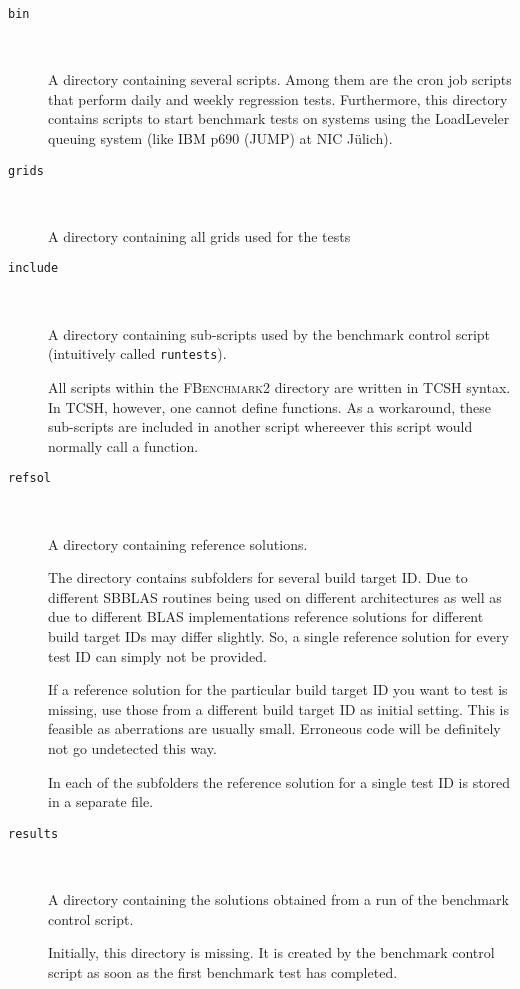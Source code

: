 \begin{description}
\item[\texttt{bin}] \

  A directory containing several scripts. Among them are the cron job scripts
  that perform daily and weekly regression tests. Furthermore, this directory
  contains scripts to start benchmark tests on systems using the LoadLeveler
  queuing system (like IBM p690 (JUMP) at NIC J\"ulich).

\item[\texttt{grids}] \

  A directory containing all grids used for the tests

\item[\texttt{include}] \

  A directory containing sub-scripts used by the benchmark control script
  (intuitively called \texttt{runtests}).

  All scripts within the \textsc{FBenchmark2} directory are written in TCSH
  syntax. In TCSH, however, one cannot define functions. As a workaround, these
  sub-scripts are included in another script whereever this script would
  normally call a function.

\item[\texttt{refsol}] \

  A directory containing reference solutions.

  The directory contains subfolders for several build target ID. Due to
  different SBBLAS routines being used on different architectures as well as due
  to different BLAS implementations reference solutions for different build
  target IDs may differ slightly. So, a single reference solution for every test
  ID can simply not be provided.

  If a reference solution for the particular build target ID you want to test is
  missing, use those from a different build target ID as initial setting. This
  is feasible as aberrations are usually small. Erroneous code will be
  definitely not go undetected this way.

  In each of the subfolders the reference solution for a single test ID is stored in a
  separate file.

\item[\texttt{results}] \

  A directory containing the solutions obtained from a run of the benchmark
  control script.

  Initially, this directory is missing. It is created by the benchmark
  control script as soon as the first benchmark test has completed.


\end{description}
